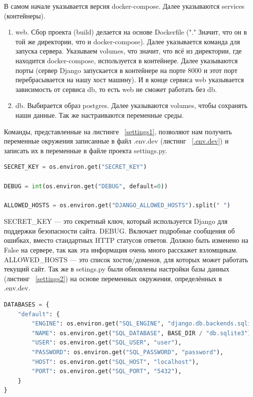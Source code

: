 	В самом начале указывается версия \textsf{docker-compose}. Далее указываются \textsf{services} (контейнеры). 
\begin{enumerate}
	\item \textsf{web}. Сбор проекта (\textsf{build}) делается на основе \textsf{Dockerfile} ("\textsf{.}" Значит, что он в той же директории, что и \textsf{docker-compose}). Далее указывается команда для запуска сервера. Указываем \textsf{volumes}, что значит, что всё из директории, где находится \textsf{docker-compose}, используется в контейнере. Далее указываются порты (сервер \textsf{Django} запускается в контейнере на порте \textsf{8000} и этот порт перебрасывается на нашу хост машину). И в конце сервиса \textsf{web} указывается зависимость от сервиса \textsf{db}, то есть \textsf{web} не сможет работать без \textsf{db}.
	\item \textsf{db}. Выбирается образ \textsf{postgres}. Далее указываются volumes, чтобы сохранять наши данные. Так же настраиваются переменные среды.
\end{enumerate}
	Команды, представленные на листинге ~\ref{settings1}, позволяют нам получить переменные окружения записанные в файл \textsf{.env.dev} (листинг ~\ref{.env.dev}) и записать их в переменные в файле проекта \textsf{settings.py}.

\begin{lstlisting}[frame=single, label={settings1}, caption={Обновлённые переменные в \textsf{settings.py}}, language=Python] 
SECRET_KEY = os.environ.get("SECRET_KEY")

DEBUG = int(os.environ.get("DEBUG", default=0))

ALLOWED_HOSTS = os.environ.get("DJANGO_ALLOWED_HOSTS").split(" ")
\end{lstlisting}

	\textsf{SECRET_KEY} — это секретный ключ, который используется Django для поддержки безопасности сайта.
	\textsf{DEBUG}. Включает подробные сообщения об ошибках, вместо стандартных \textsf{HTTP} статусов ответов. Должно быть изменено на \textsf{False} на сервере, так как эта информация очень много расскажет взломщикам.
	\textsf{ALLOWED_HOSTS} — это список хостов/доменов, для которых может работать текущий сайт.
	Так же в \textsf{setings.py} были обновлены настройки базы данных (листинг ~\ref{settings2}) на основе переменных окружения, определённых в \textsf{.env.dev}.

\begin{lstlisting}[frame=single, label={settings2}, caption={Обновлённые переменные в \textsf{settings.py}}, language=Python] 
DATABASES = {
    "default": {
        "ENGINE": os.environ.get("SQL_ENGINE", "django.db.backends.sqlite3"),
        "NAME": os.environ.get("SQL_DATABASE", BASE_DIR / "db.sqlite3"),
        "USER": os.environ.get("SQL_USER", "user"),
        "PASSWORD": os.environ.get("SQL_PASSWORD", "password"),
        "HOST": os.environ.get("SQL_HOST", "localhost"),
        "PORT": os.environ.get("SQL_PORT", "5432"),
    }
}
\end{lstlisting}


